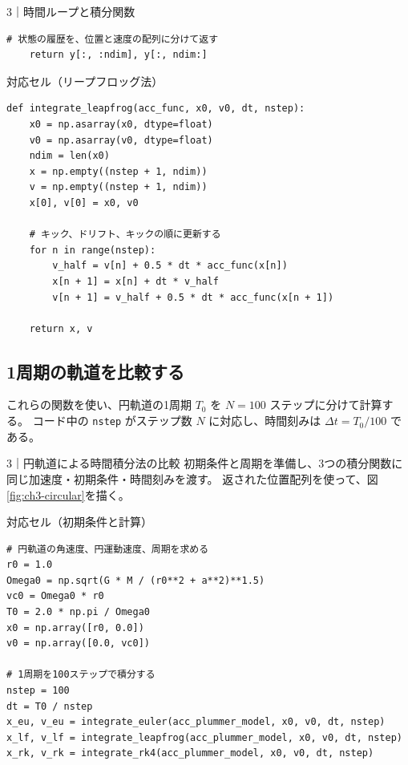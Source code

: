 \begin{notebookblock}{3｜時間ループと積分関数}
\begin{minipage}{\linewidth}
\begin{Verbatim}[xleftmargin=2mm,fontsize=\small,frame=single,framesep=1.8mm,framerule=0.35pt,rulecolor=\color{listingframe},fillcolor=\color{listingbg}]
    # 状態の履歴を、位置と速度の配列に分けて返す
    return y[:, :ndim], y[:, ndim:]
\end{Verbatim}
\end{minipage}

\par\smallskip\noindent\begin{minipage}{\linewidth}
{\sffamily\small\color{graytext}対応セル（リープフロッグ法）}
\begin{Verbatim}[xleftmargin=2mm,fontsize=\small,frame=single,framesep=1.8mm,framerule=0.35pt,rulecolor=\color{listingframe},fillcolor=\color{listingbg}]
def integrate_leapfrog(acc_func, x0, v0, dt, nstep):
    x0 = np.asarray(x0, dtype=float)
    v0 = np.asarray(v0, dtype=float)
    ndim = len(x0)
    x = np.empty((nstep + 1, ndim))
    v = np.empty((nstep + 1, ndim))
    x[0], v[0] = x0, v0

    # キック、ドリフト、キックの順に更新する
    for n in range(nstep):
        v_half = v[n] + 0.5 * dt * acc_func(x[n])
        x[n + 1] = x[n] + dt * v_half
        v[n + 1] = v_half + 0.5 * dt * acc_func(x[n + 1])

    return x, v
\end{Verbatim}
\end{minipage}
\end{notebookblock}

\subsection{1周期の軌道を比較する}

これらの関数を使い、円軌道の1周期 $T_0$ を $N=100$ ステップに分けて計算する。
コード中の \texttt{nstep} がステップ数 $N$ に対応し、時間刻みは $\Delta t=T_0/100$ である。
\begin{notebookblock}{3｜円軌道による時間積分法の比較}
初期条件と周期を準備し、3つの積分関数に同じ加速度・初期条件・時間刻みを渡す。
返された位置配列を使って、図\ref{fig:ch3-circular}を描く。

\par\smallskip\noindent\begin{minipage}{\linewidth}
{\sffamily\small\color{graytext}対応セル（初期条件と計算）}
\begin{Verbatim}[xleftmargin=2mm,fontsize=\small,frame=single,framesep=1.8mm,framerule=0.35pt,rulecolor=\color{listingframe},fillcolor=\color{listingbg}]
# 円軌道の角速度、円運動速度、周期を求める
r0 = 1.0
Omega0 = np.sqrt(G * M / (r0**2 + a**2)**1.5)
vc0 = Omega0 * r0
T0 = 2.0 * np.pi / Omega0
x0 = np.array([r0, 0.0])
v0 = np.array([0.0, vc0])

# 1周期を100ステップで積分する
nstep = 100
dt = T0 / nstep
x_eu, v_eu = integrate_euler(acc_plummer_model, x0, v0, dt, nstep)
x_lf, v_lf = integrate_leapfrog(acc_plummer_model, x0, v0, dt, nstep)
x_rk, v_rk = integrate_rk4(acc_plummer_model, x0, v0, dt, nstep)
\end{Verbatim}
\end{minipage}
\end{notebookblock}

